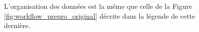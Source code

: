\documentclass[10pt,a4paper,titlepage]{article}
\begin{document}
\begin{figure}[H]
\begin{center}
{            %
            L'organisation des données est la même que celle de la Figure \ref{fig:workflow_prepro_original} décrite dans la légende de cette dernière.
        }
        \label{fig:workflow_prepro_main}
    \end{center}
\end{figure}






\end{document}
